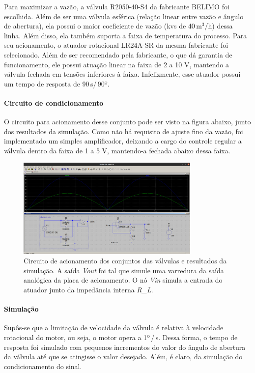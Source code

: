 Para maximizar a vazão, a válvula R2050-40-S4 da fabricante BELIMO foi escolhida. Além de ser uma válvula esférica (relação linear entre vazão e ângulo de abertura), ela possui o maior coeficiente de vazão (kvs de 40\,m$^3$/h) dessa linha. Além disso, ela também suporta a faixa de temperatura do processo. Para seu acionamento, o atuador rotacional LR24A-SR da mesma fabricante foi selecionado. Além de ser recomendado pela fabricante, o que dá garantia de funcionamento, ele possui atuação linear na faixa de 2 a 10 V, mantendo a válvula fechada em tensões inferiores à faixa. Infelizmente, esse atuador possui um tempo de resposta de 90\,s/\,90º.

\paragraph{Circuito de condicionamento}\mbox{}

O circuito para acionamento desse conjunto pode ser visto na figura abaixo, junto dos resultados da simulação. Como não há requisito de ajuste fino da vazão, foi implementado um simples amplificador, deixando a cargo do controle regular a válvula dentro da faixa de 1 a 5 V, mantendo-a fechada abaixo dessa faixa.

\begin{figure}[H]
    \centering
    \includegraphics[width=0.8\textwidth]{imagens/valves_circ.png}
    \caption{Circuito de acionamento dos conjuntos das válvulas e resultados da simulação. A saída \emph{Vout} foi tal que simule uma varredura da saída analógica da placa de acionamento. O nó \emph{Vin} simula a entrada do atuador junto da impedância interna \emph{R\_L}.}
    \label{fig:imagens-valves_circ-png}
\end{figure}

\paragraph{Simulação}\mbox{}

Supôs-se que a limitação de velocidade da válvula é relativa à velocidade rotacional do motor, ou seja, o motor opera a 1º\,/\,s. Dessa forma, o tempo de resposta foi simulado com pequenos incrementos do valor do ângulo de abertura da válvula até que se atingisse o valor desejado. Além, é claro, da simulação do condicionamento do sinal.

